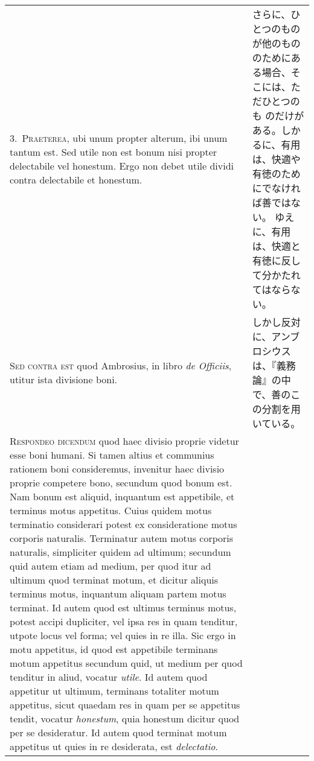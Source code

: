 \documentclass[10pt]{jsarticle}
\begin{document}
\begin{longtable}{p{21em}p{21em}}
3.~{\scshape Praeterea}, ubi unum propter alterum, ibi unum tantum est. Sed
 utile non est bonum nisi propter delectabile vel honestum. Ergo non
 debet utile dividi contra delectabile et honestum.

&

さらに、ひとつのものが他のもののためにある場合、そこには、ただひとつのも
 のだけがある。しかるに、有用は、快適や有徳のためにでなければ善ではない。
 ゆえに、有用は、快適と有徳に反して分かたれてはならない。


\\

{\scshape Sed contra est} quod Ambrosius, in libro {\itshape de
 Officiis}, utitur ista divisione boni.

&


しかし反対に、アンブロシウスは、『義務論』の中で、善のこの分割を用いている。

\\

{\scshape Respondeo dicendum} quod haec divisio proprie videtur esse boni
 humani. Si tamen altius et communius rationem boni consideremus,
 invenitur haec divisio proprie competere bono, secundum quod bonum
 est. Nam bonum est aliquid, inquantum est appetibile, et terminus motus
 appetitus. Cuius quidem motus terminatio considerari potest ex
 consideratione motus corporis naturalis. Terminatur autem motus
 corporis naturalis, simpliciter quidem ad ultimum; secundum quid autem
 etiam ad medium, per quod itur ad ultimum quod terminat motum, et
 dicitur aliquis terminus motus, inquantum aliquam partem motus
 terminat. Id autem quod est ultimus terminus motus, potest accipi
 dupliciter, vel ipsa res in quam tenditur, utpote locus vel forma; vel
 quies in re illa. Sic ergo in motu appetitus, id quod est appetibile
 terminans motum appetitus secundum quid, ut medium per quod tenditur in
 aliud, vocatur {\itshape utile}. Id autem quod appetitur ut ultimum, terminans
 totaliter motum appetitus, sicut quaedam res in quam per se appetitus
 tendit, vocatur {\itshape honestum}, quia honestum dicitur quod per se
 desideratur. Id autem quod terminat motum appetitus ut quies in re
 desiderata, est {\itshape delectatio}.

&



\end{longtable}
\end{document}
